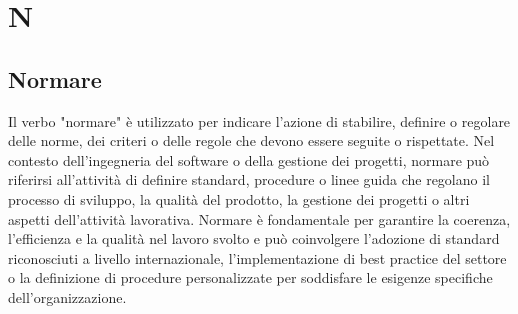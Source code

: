 \section{N}

\vspace{2em}
\subsection*{Normare}
\par Il verbo "normare" è utilizzato per indicare l'azione di stabilire, definire o regolare delle norme, dei criteri o delle regole che devono essere seguite o rispettate. Nel contesto dell'ingegneria del software o della gestione dei progetti, normare può riferirsi all'attività di definire standard, procedure o linee guida che regolano il processo di sviluppo, la qualità del prodotto, la gestione dei progetti o altri aspetti dell'attività lavorativa. Normare è fondamentale per garantire la coerenza, l'efficienza e la qualità nel lavoro svolto e può coinvolgere l'adozione di standard riconosciuti a livello internazionale, l'implementazione di best practice del settore o la definizione di procedure personalizzate per soddisfare le esigenze specifiche dell'organizzazione.
